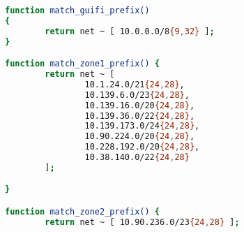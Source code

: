 \begin{lstlisting}[language=bash, caption={Bird Functions}]
function match_guifi_prefix()
{
        return net ~ [ 10.0.0.0/8{9,32} ];
}

function match_zone1_prefix() {
        return net ~ [
                10.1.24.0/21{24,28},
                10.139.6.0/23{24,28},
                10.139.16.0/20{24,28},
                10.139.36.0/22{24,28},
                10.139.173.0/24{24,28},
                10.90.224.0/20{24,28},
                10.228.192.0/20{24,28},
                10.38.140.0/22{24,28}
        ];

}

function match_zone2_prefix() {
        return net ~ [ 10.90.236.0/23{24,28} ];
\end{lstlisting}